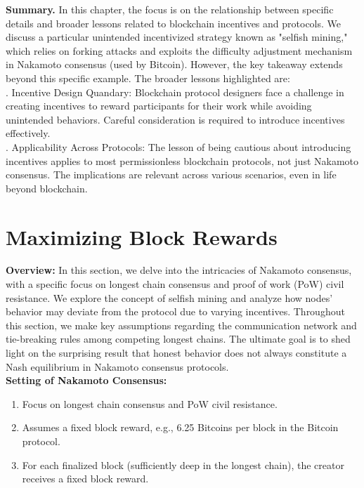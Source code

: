 \textbf{Summary.}
In this chapter, the focus is on the relationship between specific details and broader lessons related to blockchain incentives and protocols. We discuss a particular unintended incentivized strategy known as "selfish mining," which relies on forking attacks and exploits the difficulty adjustment mechanism in Nakamoto consensus (used by Bitcoin). However, the key takeaway extends beyond this specific example. The broader lessons highlighted are:\\
. Incentive Design Quandary: Blockchain protocol designers face a challenge in creating incentives to reward participants for their work while avoiding unintended behaviors. Careful consideration is required to introduce incentives effectively.\\
. Applicability Across Protocols: The lesson of being cautious about introducing incentives applies to most permissionless blockchain protocols, not just Nakamoto consensus. The implications are relevant across various scenarios, even in life beyond blockchain.\\


\section{Maximizing Block Rewards}

\textbf{Overview:}
In this section, we delve into the intricacies of Nakamoto consensus, with a specific focus on longest chain consensus and proof of work 
(PoW) civil resistance. We explore the concept of selfish mining and analyze how nodes' behavior may deviate from the protocol due to varying incentives. Throughout this section, we make key assumptions regarding the communication network and tie-breaking rules among competing longest chains. The ultimate goal is to shed light on the surprising result that honest behavior does not always constitute a Nash equilibrium in Nakamoto consensus protocols.\\

\textbf{Setting of Nakamoto Consensus:}
\begin{enumerate}
  \item Focus on longest chain consensus and PoW civil resistance.
  \item Assumes a fixed block reward, e.g., 6.25 Bitcoins per block in the Bitcoin protocol.
  \item For each finalized block (sufficiently deep in the longest chain), the creator receives a fixed block reward.
\end{enumerate}

